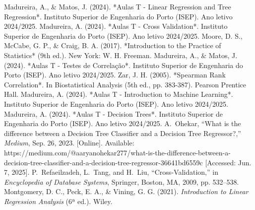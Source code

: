 \documentclass[conference]{IEEEtran}
\begin{document}
\begin{thebibliography}{00}
Madureira, A., \& Matos, J. (2024). *Aulas T - Linear Regression and Tree Regression*. Instituto Superior de Engenharia do Porto (ISEP). Ano letivo 2024/2025.
Madureira, A. (2024). *Aulas T - Cross Validation*. Instituto Superior de Engenharia do Porto (ISEP). Ano letivo 2024/2025.
Moore, D. S., McCabe, G. P., \& Craig, B. A. (2017). *Introduction to the Practice of Statistics* (9th ed.). New York: W. H. Freeman.
Madureira, A., \& Matos, J. (2024). *Aulas T - Testes de Correlação*. Instituto Superior de Engenharia do Porto (ISEP). Ano letivo 2024/2025.
Zar, J. H. (2005). *Spearman Rank Correlation*. In Biostatistical Analysis (5th ed., pp. 383-387). Pearson Prentice Hall.
Madureira, A. (2024). *Aulas T - Introduction to Machine Learning*. Instituto Superior de Engenharia do Porto (ISEP). Ano letivo 2024/2025.
Madureira, A. (2024). *Aulas T - Decision Trees*. Instituto Superior de Engenharia do Porto (ISEP). Ano letivo 2024/2025.
A.~Ohekar, ``What is the difference between a Decision Tree Classifier and a Decision Tree Regressor?,'' \emph{Medium}, Sep. 26, 2023. [Online]. Available: https://medium.com/@aaryanohekar277/what-is-the-difference-between-a-decision-tree-classifier-and-a-decision-tree-regressor-36641bd6559c [Accessed: Jun. 7, 2025].
P.~Refaeilzadeh, L.~Tang, and H.~Liu, ``Cross-Validation,'' in \emph{Encyclopedia of Database Systems}, Springer, Boston, MA, 2009, pp. 532--538.
Montgomery, D. C., Peck, E. A., \& Vining, G. G. (2021). 
\textit{Introduction to Linear Regression Analysis} (6ª ed.). Wiley.




\end{thebibliography}
\end{document}
